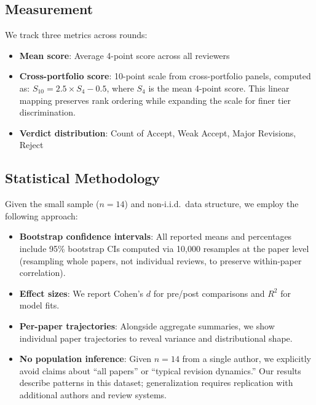\subsection{Measurement}

We track three metrics across rounds:
\begin{itemize}
    \item \textbf{Mean score}: Average 4-point score across all reviewers
    \item \textbf{Cross-portfolio score}: 10-point scale from cross-portfolio panels, computed as: $S_{10} = 2.5 \times S_{4} - 0.5$, where $S_{4}$ is the mean 4-point score. This linear mapping preserves rank ordering while expanding the scale for finer tier discrimination.
    \item \textbf{Verdict distribution}: Count of Accept, Weak Accept, Major Revisions, Reject
\end{itemize}

\subsection{Statistical Methodology}

Given the small sample ($n=14$) and non-i.i.d.\ data structure, we employ the following approach:

\begin{itemize}
    \item \textbf{Bootstrap confidence intervals}: All reported means and percentages include 95\% bootstrap CIs computed via 10,000 resamples at the paper level (resampling whole papers, not individual reviews, to preserve within-paper correlation).
    \item \textbf{Effect sizes}: We report Cohen's $d$ for pre/post comparisons and $R^2$ for model fits.
    \item \textbf{Per-paper trajectories}: Alongside aggregate summaries, we show individual paper trajectories to reveal variance and distributional shape.
    \item \textbf{No population inference}: Given $n=14$ from a single author, we explicitly avoid claims about ``all papers'' or ``typical revision dynamics.'' Our results describe patterns in this dataset; generalization requires replication with additional authors and review systems.
\end{itemize}
